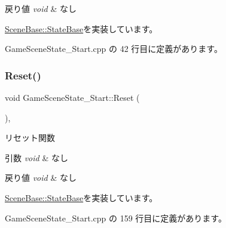 \begin{DoxyRetVals}{戻り値}
{\em void} & なし \\
\hline
\end{DoxyRetVals}


\mbox{\hyperlink{class_scene_base_1_1_state_base_a33350231b039a2178c19beac0211c5b8}{Scene\+Base\+::\+State\+Base}}を実装しています。



 Game\+Scene\+State\+\_\+\+Start.\+cpp の 42 行目に定義があります。

\mbox{\label{class_game_scene_state___start_a59270f7b65613f580864ed8ea3056179}} 
\subsubsection{\texorpdfstring{Reset()}{Reset()}}
{\footnotesize\ttfamily void Game\+Scene\+State\+\_\+\+Start\+::\+Reset (\begin{DoxyParamCaption}{ }\end{DoxyParamCaption})\hspace{0.3cm}{\ttfamily [override]}, {\ttfamily [virtual]}}



リセット関数 


\begin{DoxyParams}{引数}
{\em void} & なし \\
\hline
\end{DoxyParams}

\begin{DoxyRetVals}{戻り値}
{\em void} & なし \\
\hline
\end{DoxyRetVals}


\mbox{\hyperlink{class_scene_base_1_1_state_base_a2e14a3afece0b1d8db9edcebf514a977}{Scene\+Base\+::\+State\+Base}}を実装しています。



 Game\+Scene\+State\+\_\+\+Start.\+cpp の 159 行目に定義があります。

\mbox{\label{class_game_scene_state___start_a636df8b7ac0173b044b0efc2927fb83b}} 

